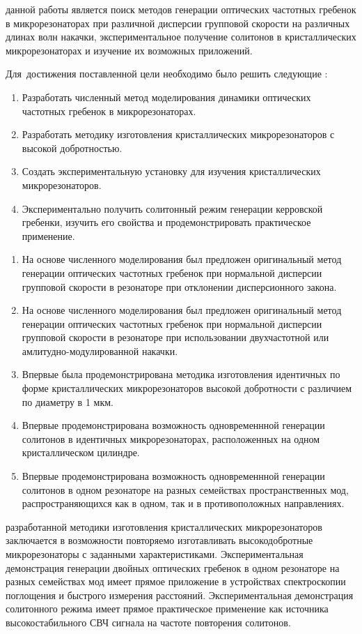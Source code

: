 {\aim} данной работы является поиск методов генерации оптических частотных гребенок в микрорезонаторах при различной дисперсии групповой скорости на различных длинах волн накачки, экспериментальное получение солитонов в кристаллических микрорезонаторах и изучение их возможных приложений.

Для~достижения поставленной цели необходимо было решить следующие {\tasks}:
\begin{enumerate}
  \item Разработать численный метод моделирования динамики оптических частотных гребенок в микрорезонаторах.
  \item Разработать методику изготовления кристаллических микрорезонаторов с высокой добротностью.
  \item Создать экспериментальную установку для изучения кристаллических микрорезонаторов.
  \item Экспериментально получить солитонный режим генерации керровской гребенки, изучить его свойства и продемонстрировать практическое применение.
\end{enumerate}


{\novelty}
\begin{enumerate}
  \item На основе численного моделирования был предложен оригинальный метод генерации оптических частотных гребенок при нормальной дисперсии групповой скорости в резонаторе при отклонении дисперсионного закона.
  \item На основе численного моделирования был предложен оригинальный метод генерации оптических частотных гребенок при нормальной дисперсии групповой скорости в резонаторе при использовании двухчастотной или амлитудно-модулированной накачки.
  \item Впервые была продемонстрирована методика изготовления идентичных по форме кристаллических микрорезонаторов высокой добротности с различием по диаметру в 1 мкм.
  \item Впервые продемонстрирована возможность одновременнной генерации солитонов в идентичных микрорезонаторах, расположенных на одном кристаллическом цилиндре.
  \item Впервые продемонстрирована возможность одновременнной генерации солитонов в одном резонаторе на разных семействах пространственных мод, распространяющихся как в одном, так и в противоположных направлениях. 
\end{enumerate}

{\influence} разработанной методики изготовления кристаллических микрорезонаторов заключается в возможности повторяемо изготавливать высокодобротные микрорезонаторы с заданными характеристиками. Экспериментальная демонстрация генерации двойных оптических гребенок в одном резонаторе на разных семействах мод имеет прямое приложение в устройствах спектроскопии поглощения и быстрого измерения расстояний. Экспериментальная демонстрация солитонного режима имеет прямое практическое применение как источника высокостабильного СВЧ сигнала на частоте повторения солитонов.

